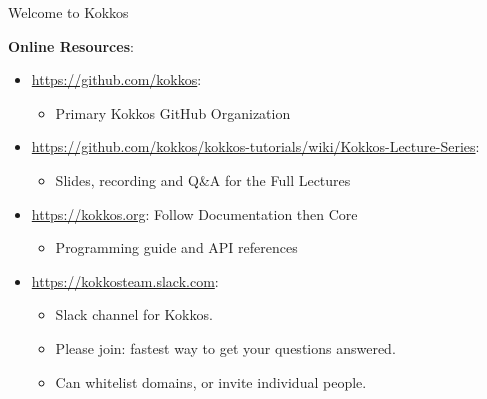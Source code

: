 \begin{frame}{Welcome to Kokkos}

\textbf{Online Resources}:

\begin{itemize}
        \item \url{https://github.com/kokkos}:
                \begin{itemize}
                        \item Primary Kokkos GitHub Organization
                \end{itemize}
        \item \url{https://github.com/kokkos/kokkos-tutorials/wiki/Kokkos-Lecture-Series}:
                \begin{itemize}
			\item{Slides, recording and Q\&A for the Full Lectures}
                \end{itemize}
        \item \url{https://kokkos.org}: Follow Documentation then Core
                \begin{itemize}
                        \item Programming guide and API references
                \end{itemize}
        \item \url{https://kokkosteam.slack.com}:
                \begin{itemize}
                        \item Slack channel for Kokkos.
                        \item Please join: fastest way to get your questions answered.
                        \item Can whitelist domains, or invite individual people.
                \end{itemize}
\end{itemize}

\end{frame}









%

